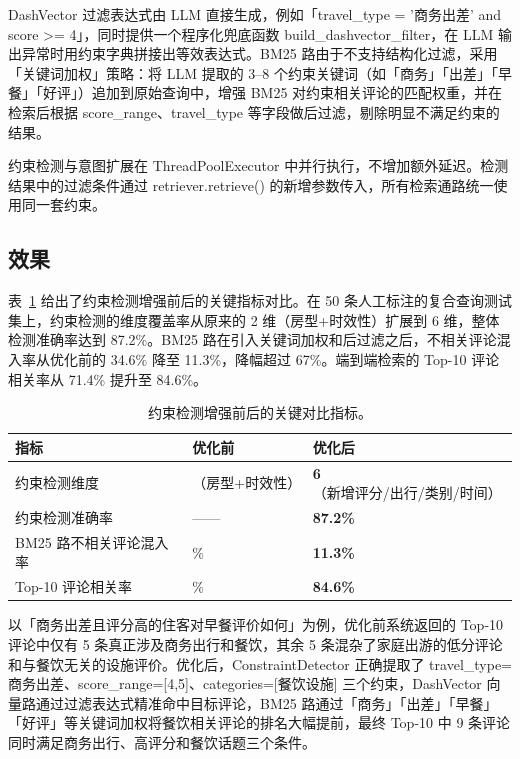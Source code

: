 \documentclass[11pt]{ctexart}
\begin{document}
DashVector 过滤表达式由 LLM 直接生成，例如「travel\_type = '商务出差' and score >= 4」，同时提供一个程序化兜底函数 build\_dashvector\_filter，在 LLM 输出异常时用约束字典拼接出等效表达式。BM25 路由于不支持结构化过滤，采用「关键词加权」策略：将 LLM 提取的 3--8 个约束关键词（如「商务」「出差」「早餐」「好评」）追加到原始查询中，增强 BM25 对约束相关评论的匹配权重，并在检索后根据 score\_range、travel\_type 等字段做后过滤，剔除明显不满足约束的结果。

约束检测与意图扩展在 ThreadPoolExecutor 中并行执行，不增加额外延迟。检测结果中的过滤条件通过 retriever.retrieve() 的新增参数传入，所有检索通路统一使用同一套约束。

\subsection{效果}

表~\ref{tab:constraint} 给出了约束检测增强前后的关键指标对比。在 50 条人工标注的复合查询测试集上，约束检测的维度覆盖率从原来的 2 维（房型+时效性）扩展到 6 维，整体检测准确率达到 87.2\%。BM25 路在引入关键词加权和后过滤之后，不相关评论混入率从优化前的 34.6\% 降至 11.3\%，降幅超过 67\%。端到端检索的 Top-10 评论相关率从 71.4\% 提升至 84.6\%。

\begin{table}[H]
  \centering
  \small
  \caption{约束检测增强前后的关键对比指标。}
  \label{tab:constraint}
  \renewcommand{\arraystretch}{1.2}
  \begin{tabularx}{\textwidth}{>{\raggedright\arraybackslash}p{6.0cm} >{\centering\arraybackslash}X >{\centering\arraybackslash}X}
    \toprule
    \rowcolor{Soft}
    \textbf{指标} & \textbf{优化前} & \textbf{优化后} \\
    \midrule
    约束检测维度               & 2（房型+时效性） & \textbf{6}（新增评分/出行/类别/时间） \\
    约束检测准确率              & ——     & \textbf{87.2\%} \\
    BM25 路不相关评论混入率     & 34.6\% & \textbf{11.3\%} \\
    Top-10 评论相关率           & 71.4\% & \textbf{84.6\%} \\
    \bottomrule
  \end{tabularx}
\end{table}

以「商务出差且评分高的住客对早餐评价如何」为例，优化前系统返回的 Top-10 评论中仅有 5 条真正涉及商务出行和餐饮，其余 5 条混杂了家庭出游的低分评论和与餐饮无关的设施评价。优化后，ConstraintDetector 正确提取了 travel\_type=商务出差、score\_range=[4,5]、categories=[餐饮设施] 三个约束，DashVector 向量路通过过滤表达式精准命中目标评论，BM25 路通过「商务」「出差」「早餐」「好评」等关键词加权将餐饮相关评论的排名大幅提前，最终 Top-10 中 9 条评论同时满足商务出行、高评分和餐饮话题三个条件。
\end{document}
